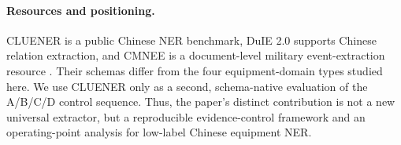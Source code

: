 \paragraph{Resources and positioning.}
CLUENER is a public Chinese NER benchmark, DuIE 2.0 supports Chinese relation
extraction, and CMNEE is a document-level military event-extraction resource
\cite{xu2020cluener,baidu2026duie,zhu2024cmnee}. Their schemas differ from the
four equipment-domain types studied here. We use CLUENER only as a second,
schema-native evaluation of the A/B/C/D control sequence. Thus, the paper's
distinct contribution is not a new universal extractor, but a reproducible
evidence-control framework and an operating-point analysis for low-label
Chinese equipment NER.
